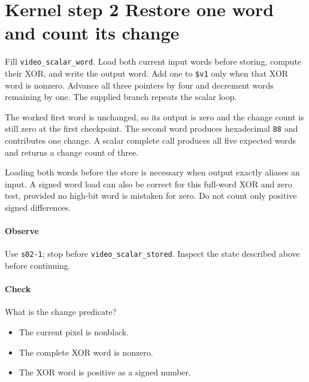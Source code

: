 \section{Kernel step 2 Restore one word and count its change}
Fill \texttt{video\_scalar\_word}. Load both current input words before storing, compute their XOR, and write the output word. Add one to \texttt{\$v1} only when that XOR word is nonzero. Advance all three pointers by four and decrement words remaining by one. The supplied branch repeats the scalar loop.

The worked first word is unchanged, so its output is zero and the change count is still zero at the first checkpoint. The second word produces hexadecimal \texttt{88} and contributes one change. A scalar complete call produces all five expected words and returns a change count of three.

Loading both words before the store is necessary when output exactly aliases an input. A signed word load can also be correct for this full-word XOR and zero test, provided no high-bit word is mistaken for zero. Do not count only positive signed differences.

\paragraph{Observe} Use \texttt{s02-1}; stop before \texttt{video\_scalar\_stored}. Inspect the state described above before continuing.

\paragraph{Check} What is the change predicate?
\begin{itemize}
\item[A.] The current pixel is nonblack.
\item[B.] The complete XOR word is nonzero.
\item[C.] The XOR word is positive as a signed number.
\end{itemize}
